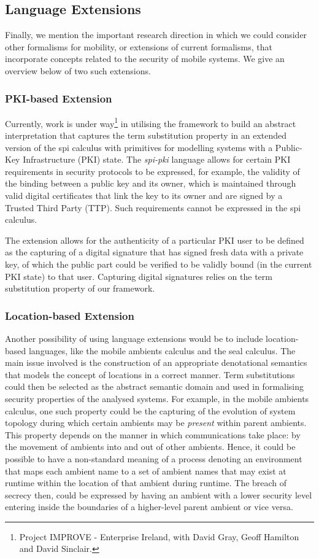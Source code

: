 \documentclass[10pt,a4paper,final,oneside,fleqn]{book}
\begin{document}
\subsection{Language Extensions}
Finally, we mention the important research direction in which we could consider other formalisms for mobility, or extensions of current formalisms, that incorporate concepts related to the security of mobile systems. We give an overview below of two such extensions.
\subsubsection{PKI-based Extension}
Currently, work is under way\footnote{Project IMPROVE - Enterprise Ireland, with David Gray, Geoff Hamilton and David Sinclair.} in utilising the framework to build an abstract interpretation that captures the term substitution property in an extended version of the spi calculus with primitives for modelling systems with a Public-Key Infrastructure (PKI) state.  The {\itshape spi-pki\/} language allows for certain PKI requirements in security protocols to be expressed, for example, the validity of the binding between a public key and its owner, which is maintained through valid digital certificates that link the key to its owner and are signed by a Trusted Third Party (TTP). Such requirements cannot be expressed in the spi calculus.

The extension allows for the authenticity of a particular PKI user to be defined as the capturing of a digital signature that has signed fresh data with a private key, of which the public part could be verified to be validly bound (in the current PKI state) to that user.  Capturing digital signatures relies on the term substitution property of our framework.

\subsubsection{Location-based Extension}
Another possibility of using language extensions would be to include location-based languages, like the mobile ambients calculus and the seal calculus.  The main issue involved is the construction of an appropriate denotational semantics that models the concept of locations in a correct manner.  Term substitutions could then be selected as the abstract semantic domain and used in formalising security properties of the analysed systems.  For example, in the mobile ambients calculus, one such property could be the capturing of the evolution of system topology during which certain ambients may be {\itshape present\/} within parent ambients.  This property depends on the manner in which communications take place: by the movement of ambients into and out of other ambients.  Hence, it could be possible to have a non-standard meaning of a process denoting an environment that maps each ambient name to a set of ambient names that may exist at runtime within the location of that ambient during runtime.  The breach of secrecy then, could be expressed by having an ambient with a lower security level entering inside the boundaries of a higher-level parent ambient or vice versa.
\end{document}
